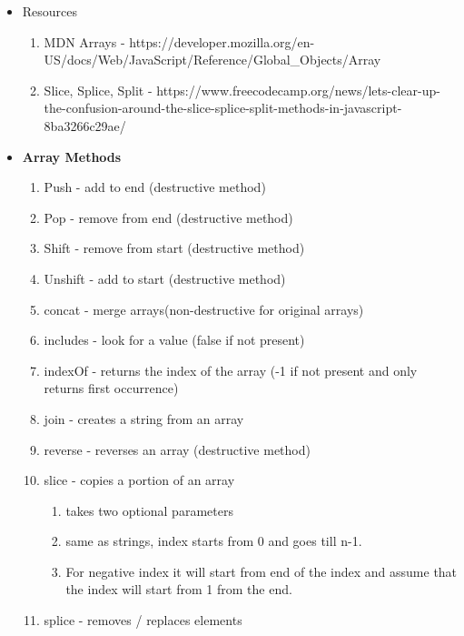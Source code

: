 \documentclass[
  paper=a4,
  ,captions=tableheading
]{scrartcl}
\providecommand{\tightlist}{%
  \setlength{\itemsep}{0pt}\setlength{\parskip}{0pt}}
\begin{document}
\begin{itemize}
\tightlist
\item
  Resources

  \begin{enumerate}
  \def\labelenumi{\arabic{enumi}.}
  \tightlist
  \item
    MDN Arrays -
    https://developer.mozilla.org/en-US/docs/Web/JavaScript/Reference/Global\_Objects/Array
  \item
    Slice, Splice, Split -
    https://www.freecodecamp.org/news/lets-clear-up-the-confusion-around-the-slice-splice-split-methods-in-javascript-8ba3266c29ae/
  \end{enumerate}
\item
  \textbf{Array Methods}

  \begin{enumerate}
  \def\labelenumi{\arabic{enumi}.}
  \tightlist
  \item
    Push - add to end (destructive method)
  \item
    Pop - remove from end (destructive method)
  \item
    Shift - remove from start (destructive method)
  \item
    Unshift - add to start (destructive method)
  \item
    concat - merge arrays(non-destructive for original arrays)
  \item
    includes - look for a value (false if not present)
  \item
    indexOf - returns the index of the array (-1 if not present and only
    returns first occurrence)
  \item
    join - creates a string from an array
  \item
    reverse - reverses an array (destructive method)
  \item
    slice - copies a portion of an array

    \begin{enumerate}
    \def\labelenumii{\arabic{enumii}.}
    \tightlist
    \item
      takes two optional parameters
    \item
      same as strings, index starts from 0 and goes till n-1.
    \item
      For negative index it will start from end of the index and assume
      that the index will start from 1 from the end.
    \end{enumerate}
  \item
    splice - removes / replaces elements


\end{enumerate}
\end{itemize}
\end{document}
